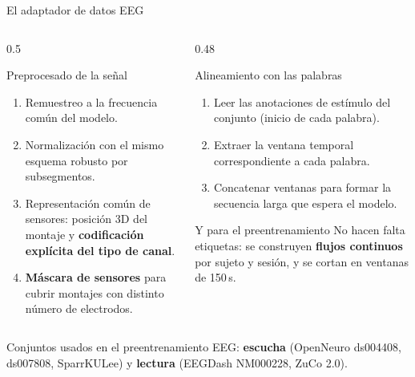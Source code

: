 \documentclass[aspectratio=169,10pt]{beamer}
\newcommand{\term}[1]{\textbf{\color{deepgreen}#1}}
\begin{document}
\begin{frame}[c]{El adaptador de datos EEG}
  \small
  \begin{columns}[t,totalwidth=\linewidth]
    \begin{column}{0.5\linewidth}
      \begin{block}{Preprocesado de la señal}
        \begin{enumerate}\footnotesize
          \item Remuestreo a la frecuencia común del modelo.
          \item Normalización con el mismo esquema robusto por subsegmentos.
          \item Representación común de sensores: posición 3D del montaje y \term{codificación explícita del tipo de canal}.
          \item \term{Máscara de sensores} para cubrir montajes con distinto número de electrodos.
        \end{enumerate}
      \end{block}
    \end{column}
    \begin{column}{0.48\linewidth}
      \begin{block}{Alineamiento con las palabras}
        \begin{enumerate}\footnotesize
          \item Leer las anotaciones de estímulo del conjunto (inicio de cada palabra).
          \item Extraer la ventana temporal correspondiente a cada palabra.
          \item Concatenar ventanas para formar la secuencia larga que espera el modelo.
        \end{enumerate}
      \end{block}
      \vspace{1mm}
      \begin{exampleblock}{Y para el preentrenamiento}
        \footnotesize No hacen falta etiquetas: se construyen \term{flujos continuos} por sujeto y sesión, y se cortan en ventanas de 150\,s.
      \end{exampleblock}
    \end{column}
  \end{columns}
  \vspace{2mm}
  \centering\small
  Conjuntos usados en el preentrenamiento EEG: \term{escucha} (OpenNeuro ds004408, ds007808, SparrKULee) y \term{lectura} (EEGDash NM000228, ZuCo 2.0).
\end{frame}
\end{document}
